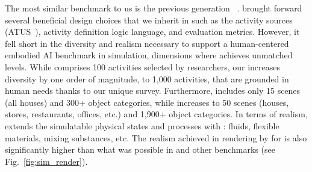 The most similar benchmark to us is the previous generation \oldbenchmark~\cite{srivastava2021behavior}. \oldbenchmark brought forward several beneficial design choices that we inherit in \benchmark such as the activity sources (ATUS~\cite{atus}), activity definition logic language, and evaluation metrics. However, it fell short in the diversity and realism necessary to support a human-centered embodied AI benchmark in simulation, dimensions where \benchmark achieves unmatched levels.
While \oldbenchmark comprises 100 activities selected by researchers, our \benchmark increases diversity by one order of magnitude, to 1,000 activities, that are grounded in human needs thanks to our unique survey. 
Furthermore, \oldbenchmark includes only 15 scenes (all houses) and 300+ object categories, while \benchmark increases to 50 scenes (houses, stores, restaurants, offices, etc.) and 1,900+ object categories. In terms of realism, \benchmark extends the simulatable physical states and processes with \simulator: fluids, flexible materials, mixing substances, etc. The realism achieved in rendering by \simulator for \benchmark is also significantly higher than what was possible in \oldbenchmark and other benchmarks (see Fig.~\ref{fig:sim_render}).




